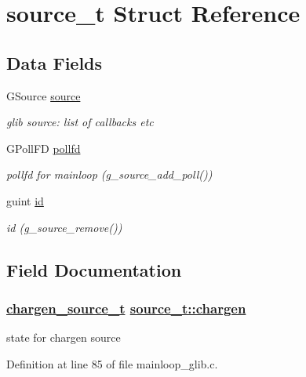 \hypertarget{structsource__t}{
\section{source\_\-t Struct Reference}
\label{structsource__t}
}
\subsection*{Data Fields}
\begin{CompactItemize}
\item 
GSource \hyperlink{structsource__t_o0}{source}
\begin{CompactList}\small\item\em glib source: list of callbacks etc \item\end{CompactList}\item 
GPoll\-FD \hyperlink{structsource__t_o1}{pollfd}
\begin{CompactList}\small\item\em pollfd for mainloop (g\_\-source\_\-add\_\-poll()) \item\end{CompactList}\item 
guint \hyperlink{structsource__t_o2}{id}
\begin{CompactList}\small\item\em id (g\_\-source\_\-remove()) \item\end{CompactList}\end{CompactItemize}


\subsection{Field Documentation}
\hypertarget{structsource__t_o5}{
\subsubsection[chargen]{\setlength{\rightskip}{0pt plus 5cm}\hyperlink{structchargen__source__t}{chargen\_\-source\_\-t} \hyperlink{structsource__t_o5}{source\_\-t::chargen}}}
\label{structsource__t_o5}


state for chargen source 



Definition at line 85 of file mainloop\_\-glib.c.

